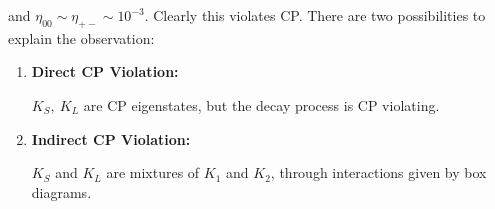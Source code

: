 and $\eta_{00} \sim \eta_{+-} \sim 10^{-3}$. Clearly this violates CP. There are two possibilities to explain the observation:
\begin{enumerate}
\item \textbf{Direct CP Violation: }

$K_S,\ K_L$ are CP eigenstates, but the decay process is CP violating.
\begin{figure}[H]
  \hfill
  \end{figure}
\item \textbf{Indirect CP Violation: }

$K_S$ and $K_L$ are mixtures of $K_1$ and $K_2$, through interactions given by box diagrams. 
\begin{figure}[H]
  \hfill
  \end{figure}
\end{enumerate}
